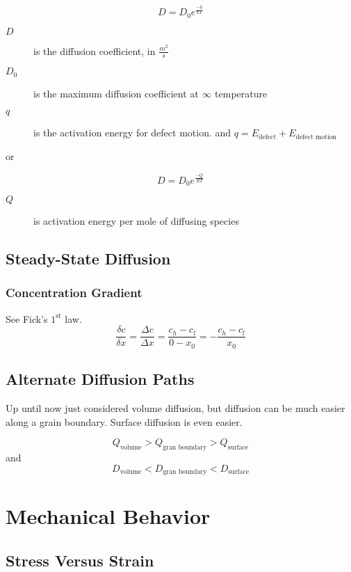 \documentclass[10pt,letterpaper]{article}
\begin{document}
	\begin{large}
		$$
		D = D_0 e^{\frac{-q}{kT}}
		$$
	\end{large}
	
	\begin{description}
		\item[$D$] is the diffusion coefficient, in $\frac{m^2}{s}$
		\item[$D_0$] is the maximum diffusion coefficient at $\infty$ temperature
		\item[$q$] is the activation energy for defect motion. 
		and $q = E_{\text{defect}} + E_{\text{defect motion}} $
	\end{description} 
	or 
	
	\begin{large}
		$$
		\boxed{D = D_0 e^{\frac{-Q}{RT}}}
		$$
	\end{large}
	\begin{description}
		\item[$Q$] is activation energy per mole of diffusing species
	\end{description}
	\subsection{Steady-State Diffusion}
	\subsubsection*{Concentration Gradient}
	See Fick's $1^{\text{st}}$ law.
	$$
	\frac{\delta c}{\delta x} = \frac{\Delta c}{\Delta x} = \frac{c_h - c_l}{0-x_0} = -\frac{c_h-c_l}{x_0}
	$$
	\subsection{Alternate Diffusion Paths}
	Up until now just considered volume diffusion, but diffusion can be much easier along a grain boundary.   Surface diffusion is even easier. 
	
	$$
	Q_{\text{volume}} > Q_{\text{gran boundary}} > Q_{\text{surface}}
	$$
	and
	$$
	D_{\text{volume}} < D_{\text{gran boundary}} < D_{\text{surface}}
	$$
	
	\section{Mechanical Behavior}

	\subsection{Stress Versus Strain}
\end{document}
